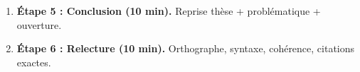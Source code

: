 \documentclass[11pt]{article}
\begin{document}
\begin{methode}
\begin{enumerate}
            \begin{itemize}
                \item \textbf{Portée :} Pourquoi ce texte est-il important ? (Avancée conceptuelle).
                \item \textbf{Limites / Objections :} Une objection argumentée (auteur opposé, contre-exemple, distinction oubliée). \emph{Attention :} Pas de « je pense que », mais « On peut objecter que... », « Cette thèse se heurte à... ».
                \item \textbf{Dépassement :} Comment la philosophie actuelle a résolu/dépassé le débat.
            \end{itemize}
        \item \textbf{Étape 5 : Conclusion (10 min).} Reprise thèse + problématique + ouverture.
        \item \textbf{Étape 6 : Relecture (10 min).} Orthographe, syntaxe, cohérence, citations exactes.
    \end{enumerate}
\end{methode}
\end{document}
